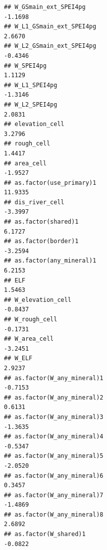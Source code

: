 \documentclass[
  a4paper,
]{article}
\begin{document}
\begin{verbatim}
## W_GSmain_ext_SPEI4pg                                                              -1.1698
## W_L1_GSmain_ext_SPEI4pg                                                            2.6670
## W_L2_GSmain_ext_SPEI4pg                                                           -0.4346
## W_SPEI4pg                                                                          1.1129
## W_L1_SPEI4pg                                                                      -1.3146
## W_L2_SPEI4pg                                                                       2.0831
## elevation_cell                                                                     3.2796
## rough_cell                                                                         1.4417
## area_cell                                                                         -1.9527
## as.factor(use_primary)1                                                           11.9335
## dis_river_cell                                                                    -3.3997
## as.factor(shared)1                                                                 6.1727
## as.factor(border)1                                                                -3.2594
## as.factor(any_mineral)1                                                            6.2153
## ELF                                                                                1.5463
## W_elevation_cell                                                                  -0.8437
## W_rough_cell                                                                      -0.1731
## W_area_cell                                                                       -3.2451
## W_ELF                                                                              2.9237
## as.factor(W_any_mineral)1                                                         -0.7153
## as.factor(W_any_mineral)2                                                          0.6131
## as.factor(W_any_mineral)3                                                         -1.3635
## as.factor(W_any_mineral)4                                                         -0.5347
## as.factor(W_any_mineral)5                                                         -2.0520
## as.factor(W_any_mineral)6                                                          0.3457
## as.factor(W_any_mineral)7                                                         -1.4869
## as.factor(W_any_mineral)8                                                          2.6892
## as.factor(W_shared)1                                                              -0.0822

\end{verbatim}
\end{document}
